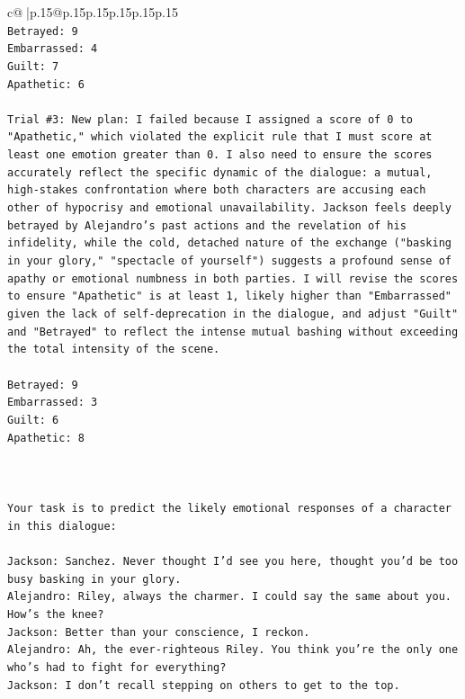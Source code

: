 \documentclass{article}
\begin{document}
{\begin{supertabular}{c@{$\;$}|p{.15\linewidth}@{}p{.15\linewidth}p{.15\linewidth}p{.15\linewidth}p{.15\linewidth}p{.15\linewidth}}
{{{\\ 
\texttt{Betrayed: 9} \\
\texttt{Embarrassed: 4} \\
\texttt{Guilt: 7} \\
\texttt{Apathetic: 6} \\
\\ 
\texttt{Trial \#3: New plan: I failed because I assigned a score of 0 to "Apathetic," which violated the explicit rule that I must score at least one emotion greater than 0. I also need to ensure the scores accurately reflect the specific dynamic of the dialogue: a mutual, high{-}stakes confrontation where both characters are accusing each other of hypocrisy and emotional unavailability. Jackson feels deeply betrayed by Alejandro's past actions and the revelation of his infidelity, while the cold, detached nature of the exchange ("basking in your glory," "spectacle of yourself") suggests a profound sense of apathy or emotional numbness in both parties. I will revise the scores to ensure "Apathetic" is at least 1, likely higher than "Embarrassed" given the lack of self{-}deprecation in the dialogue, and adjust "Guilt" and "Betrayed" to reflect the intense mutual bashing without exceeding the total intensity of the scene.} \\
\\ 
\texttt{Betrayed: 9} \\
\texttt{Embarrassed: 3} \\
\texttt{Guilt: 6} \\
\texttt{Apathetic: 8} \\
\\ 
\\ 
\\ 
\texttt{Your task is to predict the likely emotional responses of a character in this dialogue:} \\
\\ 
\texttt{Jackson: Sanchez. Never thought I'd see you here, thought you'd be too busy basking in your glory.} \\
\texttt{Alejandro: Riley, always the charmer. I could say the same about you. How's the knee?} \\
\texttt{Jackson: Better than your conscience, I reckon.} \\
\texttt{Alejandro: Ah, the ever{-}righteous Riley. You think you're the only one who's had to fight for everything?} \\
\texttt{Jackson: I don't recall stepping on others to get to the top.} \\
}}}
\end{supertabular}}
\end{document}
